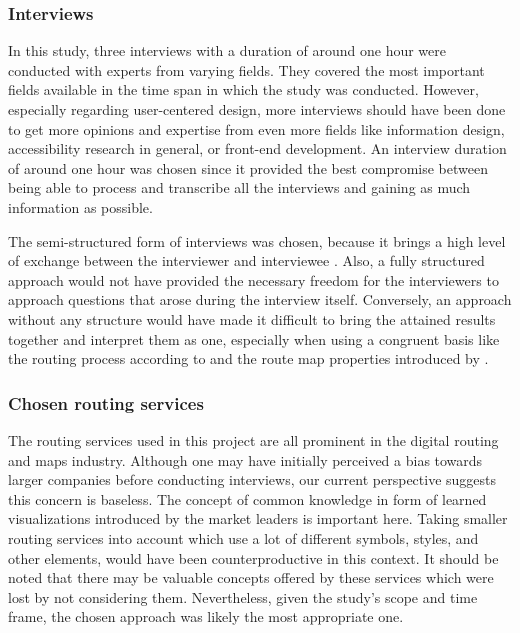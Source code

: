 \documentclass[agile, final]{copernicus-agile}
\begin{document}
\subsubsection{Interviews}

In this study, three interviews with a duration of around one hour were conducted with experts from varying fields. They covered the most important fields available in the time span in which the study was conducted. However, especially regarding user-centered design, more interviews should have been done to get more opinions and expertise from even more fields like information design, accessibility research in general, or front-end development. An interview duration of around one hour was chosen since it provided the best compromise between being able to process and transcribe all the interviews and gaining as much information as possible.

The semi-structured form of interviews was chosen, because it brings a high level of exchange between the interviewer and interviewee \citep{KallioEA2016}. Also, a fully structured approach would not have provided the necessary freedom for the interviewers to approach questions that arose during the interview itself. Conversely, an approach without any structure would have made it difficult to bring the attained results together and interpret them as one, especially when using a congruent basis like the routing process according to \citet{Delikostidis2011} and the route map properties introduced by \citet{AgrawalaStolte2000}.

\subsubsection{Chosen routing services}

The routing services used in this project are all prominent in the digital routing and maps industry. Although one may have initially perceived a bias towards larger companies before conducting interviews, our current perspective suggests this concern is baseless. The concept of common knowledge in form of learned visualizations introduced by the market leaders is important here. Taking smaller routing services into account which use a lot of different symbols, styles, and other elements, would have been counterproductive in this context. It should be noted that there may be valuable concepts offered by these services which were lost by not considering them. Nevertheless, given the study's scope and time frame, the chosen approach was likely the most appropriate one.
\end{document}

